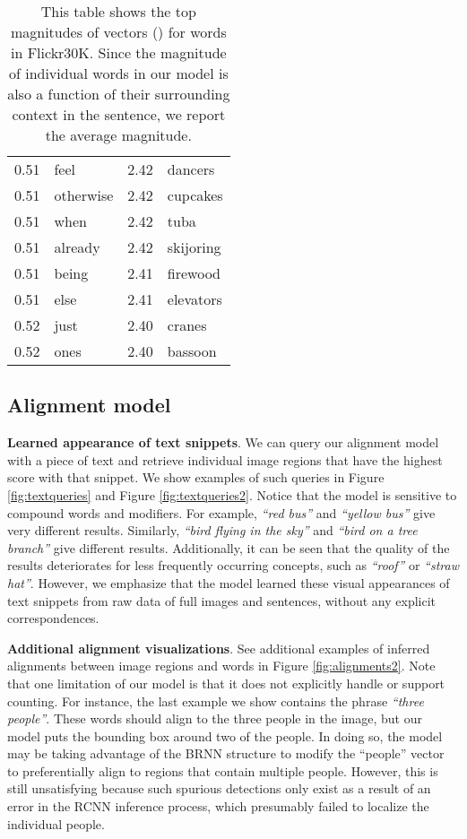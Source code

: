 \documentclass[10pt,twocolumn,letterpaper]{article}
\begin{document}
\begin{table}
\begin{tabulary}{\linewidth}{R|L|R|L}
0.51 & feel & 2.42 & dancers \\
0.51 & otherwise & 2.42 & cupcakes \\
0.51 & when & 2.42 & tuba \\
0.51 & already & 2.42 & skijoring \\
0.51 & being & 2.41 & firewood \\
0.51 & else & 2.41 & elevators \\
0.52 & just & 2.40 & cranes \\
0.52 & ones & 2.40 & bassoon \\
\hline
\end{tabulary}
\caption{This table shows the top magnitudes of vectors () for words in Flickr30K. Since the magnitude of individual words in our model is also a function of their surrounding context in the sentence, we report the average magnitude.}
\label{tab:magnitudes}
\end{table}

\clearpage

\subsection{Alignment model}

\textbf{Learned appearance of text snippets}. We can query our alignment model with a piece of text and retrieve individual image regions that have the highest score with that snippet. We show examples of such queries in Figure \ref{fig:textqueries} and Figure \ref{fig:textqueries2}. Notice that the model is sensitive to compound words and modifiers. For example, \textit{``red bus''} and \textit{``yellow bus''} give very different results. Similarly, \textit{``bird flying in the sky''} and \textit{``bird on a tree branch''} give different results. Additionally, it can be seen that the quality of the results deteriorates for less frequently occurring concepts, such as \textit{``roof''} or \textit{``straw hat''}. However, we emphasize that the model learned these visual appearances of text snippets from raw data of full images and sentences, without any explicit correspondences.

\textbf{Additional alignment visualizations}. See additional examples of inferred alignments between image regions and words in Figure \ref{fig:alignments2}. Note that one limitation of our model is that it does not explicitly handle or support counting. For instance, the last example we show contains the phrase \textit{``three people''}. These words should align to the three people in the image, but our model puts the bounding box around two of the people. In doing so, the model may be taking advantage of the BRNN structure to modify the ``people'' vector to preferentially align to regions that contain multiple people. However, this is still unsatisfying because such spurious detections only exist as a result of an error in the RCNN inference process, which presumably failed to localize the individual people.
\end{document}
